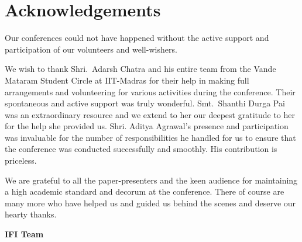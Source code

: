 
\chapter*{Acknowledgements}\label{ack}

Our conferences could not have happened without the active support and participation of our volunteers and well-wishers.

We wish to thank Shri.\ Adarsh Chatra and his entire team from the Vande Mataram Student Circle at IIT-Madras for their help in making full arrangements and volunteering for various activities during the conference. Their spontaneous and active support was truly wonderful. Smt.\ Shanthi Durga Pai was an extraordinary resource and we extend to her our deepest gratitude to her for the help she provided us. Shri. Aditya Agrawal’s presence and participation was invaluable for the number of responsibilities he handled for us to ensure that the conference was conducted successfully and smoothly. His contribution is priceless.

We are grateful to all the paper-presenters and the keen audience for maintaining a high academic standard and decorum at the conference. There of course are many more who have helped us and guided us behind the scenes and deserve our hearty thanks.

\begin{flushright}
 \textbf{IFI Team}
\end{flushright}


